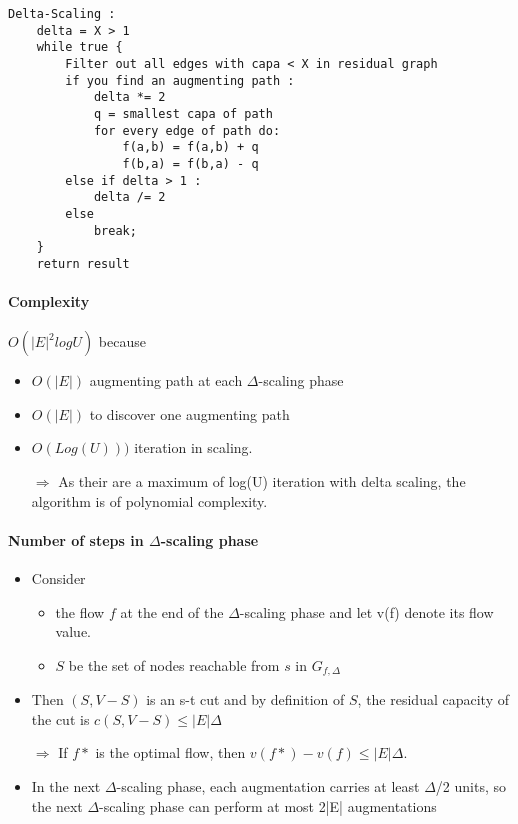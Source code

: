 \begin{lstlisting}
Delta-Scaling :
    delta = X > 1
    while true {
        Filter out all edges with capa < X in residual graph
        if you find an augmenting path :
            delta *= 2
            q = smallest capa of path
            for every edge of path do:
                f(a,b) = f(a,b) + q
                f(b,a) = f(b,a) - q
        else if delta > 1 :
            delta /= 2
        else
            break;
    }
    return result
\end{lstlisting}

\paragraph{Complexity}
$O(|E|^2 log U)$ because 
\begin{itemize} 
        \item $O(|E|)$ augmenting path at each $\Delta$-scaling phase
        \item $O(|E|)$ to discover one augmenting path
        \item $O(Log(U)))$ iteration in scaling.
            
            $\Rightarrow$ As their are a maximum of log(U) iteration with delta scaling, the
            algorithm is of polynomial complexity.
    \end{itemize}

\paragraph{Number of steps in $\Delta$-scaling phase}
\begin{itemize}
    \item Consider \begin{itemize}
                \item the flow $f$ at the end of the $\Delta$-scaling phase
and let v(f) denote its flow value.
                \item $S$ be the set of nodes reachable from $s$ in
                    $G_{f,\Delta}$
                    \end{itemize}
    \item Then $(S,V-S)$ is an s-t cut and by definition of $S$, the residual
capacity of the cut is $c(S,V-S) ≤ |E|\Delta$

    \item[$\Rightarrow$] If $f*$ is the optimal flow, then $v(f*)-v(f)
        \leq |E|\Delta$.

        \item In the next $\Delta$-scaling phase, each augmentation carries
at least $\Delta$/2 units, so the next $\Delta$-scaling phase can perform at most 2|E|
augmentations
\end{itemize}

